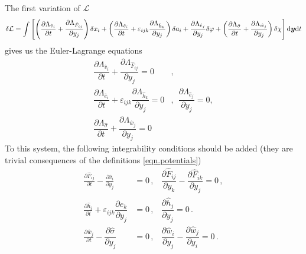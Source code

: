 \documentclass[twoside]{article}
\newcommand{\yy}{{\boldsymbol{y}}}
\newcommand{\pd}{\partial}
\newcommand{\rmd}{{\rm d}}
\begin{document}
The first variation of $\mathcal{L}$
\begin{equation}
\delta\mathcal{L}=\int\left[\left(\dfrac{\pd \Lambda_{\hat{v}_i}}{\pd t} + 
\dfrac{\pd 
\Lambda_{\hat{F}_{ij}}}{\pd y_j}\right)\delta x_i + 
\left( \dfrac{\pd \Lambda_{\hat{e}_i}}{\pd t} 
+\varepsilon_{ijk}\dfrac{\pd \Lambda_{\hat{h}_k}}{\pd y_j} \right)\delta 
a_i + 
\dfrac{\pd \Lambda_{\hat{e}_j}}{\pd y_j}\delta \varphi + 
\left( \dfrac{\pd \Lambda_{\hat{\sigma}}}{\pd t} +\dfrac{\pd 
\Lambda_{\hat{w}_j}}{\pd y_j} \right)\delta \chi 
\right]\rmd \yy \rmd t
\end{equation}
gives us the Euler-Lagrange equations
\begin{subequations}\label{eqn.EulLagr}
\begin{align}
\dfrac{\pd \Lambda_{\hat{v}_i}}{\pd t} +\dfrac{\pd 
\Lambda_{\hat{F}_{ij}}}{\pd y_j}= 0 &, \label{eqn.EulLagr.moment}\\[2mm]
\dfrac{\pd \Lambda_{\hat{e}_i}}{\pd t} 
+\varepsilon_{ijk}\dfrac{\pd \Lambda_{\hat{h}_k}}{\pd y_j}=0&,  
\ \ \dfrac{\pd \Lambda_{\hat{e}_j}}{\pd y_j}=0,
\label{eqn.EulLagr.e}  \\[2mm]
\dfrac{\pd \Lambda_{\hat{\sigma}}}{\pd t} +\dfrac{\pd 
\Lambda_{\hat{w}_j}}{\pd y_j}= 0 &\label{eqn.EulLagr.c}
\end{align}
\end{subequations}
To this system, the following integrability conditions should be added (they 
are trivial consequences of the definitions \eqref{eqn.potentials})
\begin{subequations}\label{eqn.constr}
\begin{eqnarray} 
	\frac{\pd \hat{F}_{ij}}{\pd t} - \frac{\pd \hat{v}_i}{\pd y_j} & =0\,, & 
	\dfrac{\pd \hat{F}_{ij}}{\pd y_k}-\dfrac{\pd 
	\hat{F}_{ik}}{\pd y_j}  = 0\,, \label{eqn.constr.F}\\
	\frac{\pd \hat{h}_i}{\pd t} +\varepsilon_{ijk}\dfrac{\pd \hat{e}_k}{\pd 
	y_j}     &       =0\,, & \dfrac{\pd \hat{h}_j}{\pd 
	y_j}                                               =0\,. 	
	\label{eqn.constr.h}\\
	\frac{\pd \hat{w}_j}{\pd t}  - \dfrac{\pd \hat{\sigma}}{\pd 
	y_j}     &       =0\,, & \dfrac{\pd \hat{w}_i}{\pd y_j} - \dfrac{\pd 
	\hat{w}_j}{\pd y_i} = 0\,. 	
	\label{eqn.constr.w}
\end{eqnarray}
\end{subequations}
\end{document}
